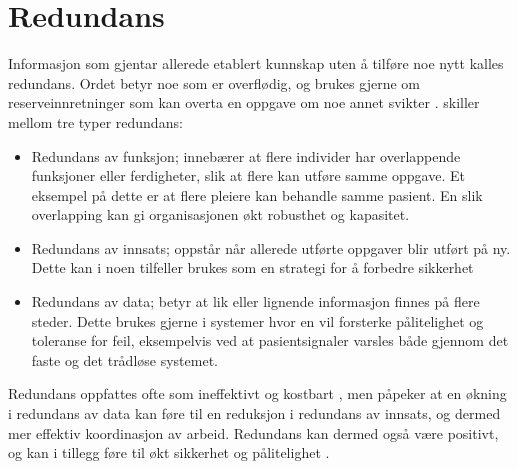 \section{Redundans}
\label{sec:redundans}

Informasjon som gjentar allerede etablert kunnskap uten å tilføre noe nytt kalles redundans. Ordet betyr noe som er overflødig, og brukes gjerne om reserveinnretninger som kan overta en oppgave om noe annet svikter \citep{Rosness}. \citet{Cabitza} skiller mellom tre typer redundans: 

\begin{itemize}
\item Redundans av funksjon; innebærer at flere individer har overlappende funksjoner eller ferdigheter, slik at flere kan utføre samme oppgave. Et eksempel på dette er at flere pleiere kan behandle samme pasient. En slik overlapping kan gi organisasjonen økt robusthet og kapasitet.
\item Redundans av innsats; oppstår når allerede utførte oppgaver blir utført på ny. Dette kan i noen tilfeller brukes som en strategi for å forbedre sikkerhet \citep{Rygh13}
\item Redundans av data; betyr at lik eller lignende informasjon finnes på flere steder.  Dette brukes gjerne i systemer hvor en vil forsterke pålitelighet og toleranse for feil, eksempelvis ved at pasientsignaler varsles både gjennom det faste og det trådløse systemet. 
\end{itemize}
 
\noindent
Redundans oppfattes ofte som ineffektivt og kostbart \citep{Rygh13}, men \citet{Cabitza} påpeker at en økning i redundans av data kan føre til en reduksjon i redundans av innsats, og dermed mer effektiv koordinasjon av arbeid. Redundans kan dermed også være positivt, og kan i tillegg føre til økt sikkerhet og pålitelighet \citep{Rygh13}.
